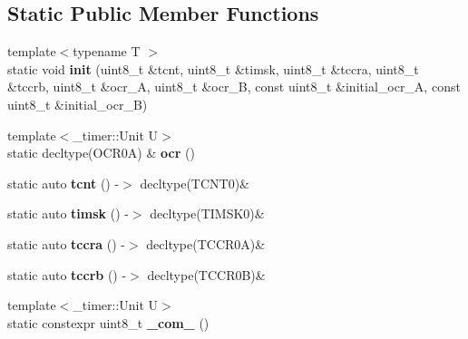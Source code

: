 \subsection*{Static Public Member Functions}
\begin{DoxyCompactItemize}
\item 
\hypertarget{struct__timer0_1_1TimerDef_ae9a4cef5f307fcb249d041ea410a0745}{}\label{struct__timer0_1_1TimerDef_ae9a4cef5f307fcb249d041ea410a0745} 
{\footnotesize template$<$typename T $>$ }\\static void {\bfseries init} (uint8\+\_\+t \&tcnt, uint8\+\_\+t \&timsk, uint8\+\_\+t \&tccra, uint8\+\_\+t \&tccrb, uint8\+\_\+t \&ocr\+\_\+A, uint8\+\_\+t \&ocr\+\_\+B, const uint8\+\_\+t \&initial\+\_\+ocr\+\_\+A, const uint8\+\_\+t \&initial\+\_\+ocr\+\_\+B)
\item 
\hypertarget{struct__timer0_1_1TimerDef_af731f20e2caa0c4f94d31377d4a43ab5}{}\label{struct__timer0_1_1TimerDef_af731f20e2caa0c4f94d31377d4a43ab5} 
{\footnotesize template$<$\+\_\+timer\+::\+Unit U$>$ }\\static decltype(O\+C\+R0A) \& {\bfseries ocr} ()
\item 
\hypertarget{struct__timer0_1_1TimerDef_ad74073fc118a69a4c02769b7fe56402d}{}\label{struct__timer0_1_1TimerDef_ad74073fc118a69a4c02769b7fe56402d} 
static auto {\bfseries tcnt} () -\/$>$ decltype(T\+C\+N\+T0)\&
\item 
\hypertarget{struct__timer0_1_1TimerDef_a30f1f4a5888376608e0b729e2614ba63}{}\label{struct__timer0_1_1TimerDef_a30f1f4a5888376608e0b729e2614ba63} 
static auto {\bfseries timsk} () -\/$>$ decltype(T\+I\+M\+S\+K0)\&
\item 
\hypertarget{struct__timer0_1_1TimerDef_a644edd603ceab7970c7398f6fe5b95a9}{}\label{struct__timer0_1_1TimerDef_a644edd603ceab7970c7398f6fe5b95a9} 
static auto {\bfseries tccra} () -\/$>$ decltype(T\+C\+C\+R0A)\&
\item 
\hypertarget{struct__timer0_1_1TimerDef_a85d21a64199315e126c6218c536952eb}{}\label{struct__timer0_1_1TimerDef_a85d21a64199315e126c6218c536952eb} 
static auto {\bfseries tccrb} () -\/$>$ decltype(T\+C\+C\+R0B)\&
\item 
\hypertarget{struct__timer0_1_1TimerDef_aa142ef4342ace48bc1f56662a758fff4}{}\label{struct__timer0_1_1TimerDef_aa142ef4342ace48bc1f56662a758fff4} 
{\footnotesize template$<$\+\_\+timer\+::\+Unit U$>$ }\\static constexpr uint8\+\_\+t {\bfseries \+\_\+com\+\_} ()
\item 
\hypertarget{struct__timer0_1_1TimerDef_ae72314a7783b7d541042ccef9c9253b5}{}\label{struct__timer0_1_1TimerDef_ae72314a7783b7d541042ccef9c9253b5} 

\end{DoxyCompactItemize}
